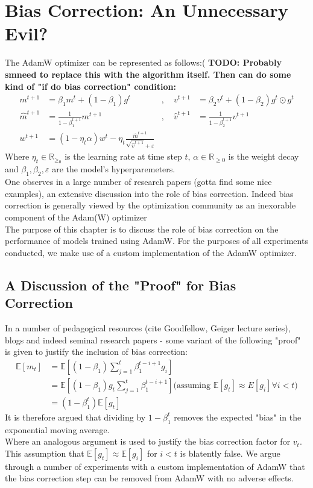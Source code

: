 \documentclass[12pt]{book}
\newcommand{\R}{\mathbb{R}}
\newcommand{\E}{\mathbb{E}}
\newcommand{\todo}[1]{{\color{red}\bf{TODO: #1}}}
\begin{document}
\section{Bias Correction: An Unnecessary Evil? }
The AdamW optimizer can be represented as follows:( \todo{Probably smneed to replace this with the algorithm itself. Then can do some kind of "if do bias correction" condition:}
\begin{equation*}
\begin{aligned}
	m^{t+1} &= \beta_1 m^{t} + (1-\beta_1)g^{t}  &, \quad  v^{t+1} &= \beta_2 v^{t} + (1-\beta_2) g^{t} \odot g^{t}\\
	\hat{m}^{t+1} &= \frac{1}{1-\beta_1^{t+1}} m^{t+1}  &, \quad \hat{v}^{t+1} &= \frac{1}{1-\beta_2^{t+1}} v^{t+1}\\
	w^{t+1} &= (1-\eta_t\alpha)w^{t} - \eta_t \frac{\hat{m}^{t+1}}{\sqrt{\hat{v}^{t+1}} +\varepsilon }
\end{aligned}
\end{equation*}
Where $\eta_t\in\R_{\ge_0}$ is the learning rate at time step $t$, $\alpha\in \R_{\ge0}$ is the weight decay and $\beta_1, \beta_2, \varepsilon $ are the model's hyperparemeters. 
\\
One observes in a large number of research papers (gotta find some nice examples), an extensive discussion into the role of bias correction. 
Indeed bias correction is generally viewed by the optimization community as an inexorable component of the Adam(W) optimizer\\
The purpose of this chapter is to discuss the role of bias correction on the performance of models trained using AdamW. For the purposes of all experiments conducted, we make use of a custom implementation of the AdamW optimizer. 
\subsection{A Discussion of the "Proof" for Bias Correction}
In a number of pedagogical resources (cite Goodfellow, Geiger lecture series), blogs and indeed seminal research papers - some variant of the following "proof" is given to justify the inclusion of bias correction:
\begin{align*}
	\E[m_t] &= \E\left[ (1-\beta_1)\sum_{j=1}^{t} {\beta_1^{t-i+1} g_i}  \right]  \\
		&= \E\left[(1-\beta_1)g_t \sum_{j=1}^{t} {\beta_1^{t-i+1}}\right] (\text{assuming $\E[g_t] \approx E[g_i]\forall i<t$)}\\
		&= (1-\beta_1^{t})\E[g_t]
\end{align*}
It is therefore argued that dividing by  $1-\beta_1^{t}$ removes the expected "bias" in the exponential moving average.\\ 
Where an analogous argument is used to justify the bias correction factor for $v_t$. \\
This assumption that $\E[g_t] \approx \E[g_i]$ for $i<t$ is blatently false. We argue through a number of experiments with a custom implementation of AdamW that the bias correction step can be removed from AdamW with no adverse effects.
\\
\end{document}
